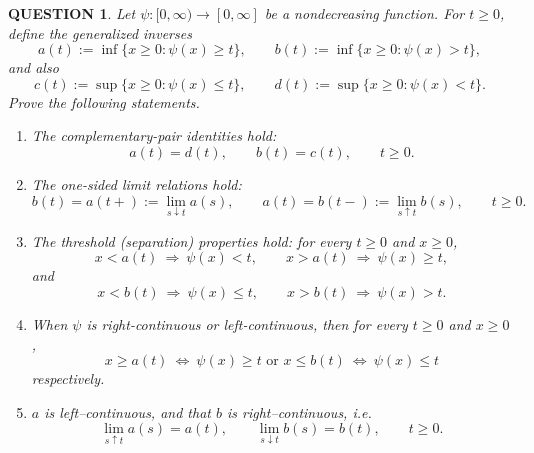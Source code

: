 \documentclass[12pt]{article}
\renewcommand{\(}{\left(}%
\renewcommand{\)}{\right)}%
\renewcommand{\[}{\left[}%
\renewcommand{\]}{\right]}%
\newtheorem{question}{QUESTION}[section]}
\begin{document}
\begin{question}
Let $\psi:[0,\infty)\to[0,\infty]$ be a nondecreasing function. For $t\ge 0$,
define the generalized inverses
\begin{equation*}
a(t):=\inf\{x\ge 0:\psi(x)\ge t\},\qquad
b(t):=\inf\{x\ge 0:\psi(x)> t\},
\end{equation*}
and also
\begin{equation*}
c(t):=\sup\{x\ge 0:\psi(x)\le t\},\qquad
d(t):=\sup\{x\ge 0:\psi(x)< t\}.
\end{equation*}
Prove the following statements.
\begin{enumerate}[(1)]
\item The complementary-pair identities hold:
\begin{equation*}
a(t)=d(t),\qquad b(t)=c(t),\qquad t\ge 0.
\end{equation*}
\item The one-sided limit relations hold:
\begin{equation*}
b(t)=a(t+):=\lim_{s\downarrow t}a(s),\qquad
a(t)=b(t-):=\lim_{s\uparrow t}b(s),\qquad t\ge 0.
\end{equation*}
\item The threshold (separation) properties hold: for every $t\ge 0$ and $x\ge 0$,
\begin{equation*}
x<a(t)\ \Rightarrow\ \psi(x)<t,\qquad
x>a(t)\ \Rightarrow\ \psi(x)\ge t,
\end{equation*}
and
\begin{equation*}
x<b(t)\ \Rightarrow\ \psi(x)\le t,\qquad
x>b(t)\ \Rightarrow\ \psi(x)>t.
\end{equation*}
\item When $\psi$ is right-continuous or left-continuous, then for every $t\ge 0$ and $x\ge 0$,
\begin{equation*}
x\ge a(t)\ \Longleftrightarrow\ \psi(x)\ge t\text{ or }x\le b(t)\ \Longleftrightarrow\ \psi(x)\le t
\end{equation*}
respectively.
\item $a$ is left--continuous,
and that $b$ is right--continuous, i.e.
\begin{equation*}
\lim_{s\uparrow t} a(s)=a(t),
\qquad
\lim_{s\downarrow t} b(s)=b(t),
\qquad t\ge 0.
\end{equation*}
\end{enumerate}
\end{question}
\end{document}
